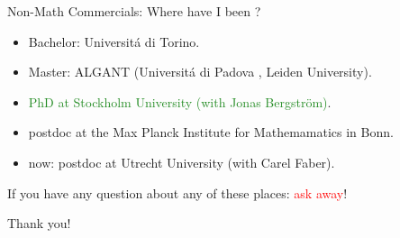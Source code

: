 \documentclass[usenames,dvipsnames]{beamer}
\newcommand{\red}[1]{\textcolor{red}{#1}}
\newcommand{\green}[1]{\textcolor{ForestGreen}{#1}}
\begin{document}
\begin{frame}{ Non-Math Commercials: Where have I been ? }
\pause \begin{itemize}\setlength\itemsep{1em}
	\item Bachelor: Universitá di Torino.
	\item Master: ALGANT (Universitá di Padova , Leiden University).
	\item \green{PhD at Stockholm University (with Jonas Bergstr\"om)}.
	\item postdoc at the Max Planck Institute for Mathemamatics in Bonn.
	\item now: postdoc at Utrecht University (with Carel Faber).
\end{itemize}
\pause If you have any question about any of these places: \red{ask away}!
\end{frame}

\begin{frame}{ }
\begin{center}
{\Large Thank you!}
\end{center}
\end{frame}
\end{document}
